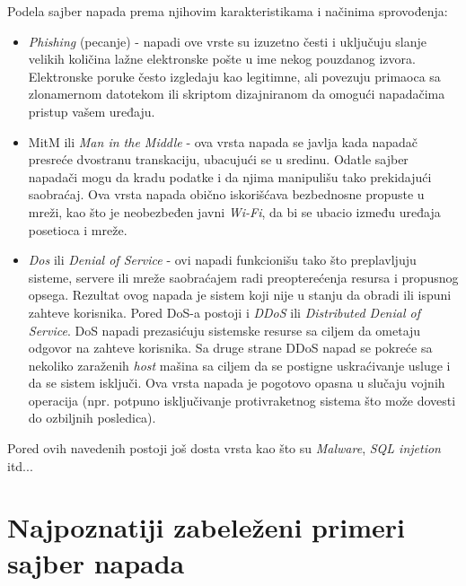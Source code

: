 \documentclass[a4paper]{article}
\begin{document}
{Podela sajber napada prema njihovim karakteristikama i načinima sprovođenja:
\begin{itemize}
    \item \emph{Phishing} (pecanje) - napadi ove vrste su izuzetno česti i uključuju slanje velikih količina lažne elektronske pošte u ime nekog pouzdanog izvora. Elektronske poruke često izgledaju kao legitimne, ali povezuju primaoca sa zlonamernom datotekom ili skriptom dizajniranom da omogući napadačima pristup vašem uređaju.
    \item MitM ili \emph{Man in the Middle} - ova vrsta napada se javlja kada napadač presreće dvostranu transkaciju, ubacujući se u sredinu. Odatle sajber napadači mogu da kradu podatke i da njima manipulišu tako prekidajući saobraćaj. Ova vrsta napada obično iskorišćava bezbednosne propuste u mreži, kao što je neobezbeđen javni \emph{Wi-Fi}, da bi se ubacio između uređaja posetioca i mreže.
    \item \emph{Dos} ili \emph{Denial of Service} - ovi napadi funkcionišu tako što preplavljuju sisteme, servere ili mreže saobraćajem radi preopterećenja resursa i propusnog opsega. Rezultat ovog napada je sistem koji nije u stanju da obradi ili ispuni zahteve korisnika.
    Pored DoS-a postoji i \emph{DDoS}  ili \emph{Distributed Denial of Service}. DoS napadi prezasićuju sistemske resurse sa ciljem da ometaju odgovor na zahteve korisnika. Sa druge strane DDoS napad se pokreće sa nekoliko zaraženih \emph{host} mašina sa ciljem da se postigne uskraćivanje usluge i da se sistem isključi. Ova vrsta napada je pogotovo opasna u slučaju vojnih operacija (npr. potpuno isključivanje protivraketnog sistema što može dovesti do ozbiljnih posledica).
\end{itemize}    
Pored ovih navedenih postoji još dosta vrsta kao što su \emph{Malware}, \emph{SQL injetion} itd...






\section{Najpoznatiji zabeleženi primeri sajber napada}
\label{sec:naslovM}



}
\end{document}
